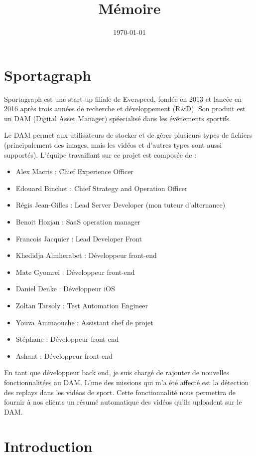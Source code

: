 \documentclass[11pt]{article}
\date{\today}
\title{Mémoire}
\begin{document}
\maketitle
\tableofcontents


\section{Sportagraph}
\label{sec:org595660f}
Sportagraph est une start-up filiale de Everspeed, fondée en 2013 et lancée en 2016 après trois années de recherche et développement (R\&D).
Son produit est un DAM (Digital Asset Manager) spéecialisé dans les événements sportifs.

Le DAM permet aux utilisateurs de stocker et de gérer plusieurs types de fichiers (principalement des images, mais les vidéos et d’autres types sont aussi supportés). 
L’équipe travaillant sur ce projet est composée de :
\begin{itemize}
\item Alex Macris : Chief Experience Officer
\item Edouard Binchet : Chief Strategy and Operation Officer
\item Régis Jean-Gilles : Lead Server Developer (mon tuteur d'alternance)
\item Benoit Hozjan : SaaS operation manager
\item Francois Jacquier : Lead Developer Front
\item Khedidja Almherabet : Développeur front-end
\item Mate Gyomrei : Développeur front-end
\item Daniel Denke : Développeur iOS
\item Zoltan Tarsoly : Test Automation Engineer
\item Youva Ammaouche : Assistant chef de projet
\item Stéphane : Développeur front-end
\item Ashant : Développeur front-end
\end{itemize}

En tant que développeur back end, je suis chargé de rajouter de nouvelles fonctionnalitées au DAM.
L'une des missions qui m'a été affecté est la détection des replays dans les vidéos de sport.
Cette fonctionnalité nous permettra de fournir à nos clients un résumé automatique des vidéos qu'ils uploadent sur le DAM.

\section{Introduction}
\label{sec:org6abe3fa}
\end{document}
